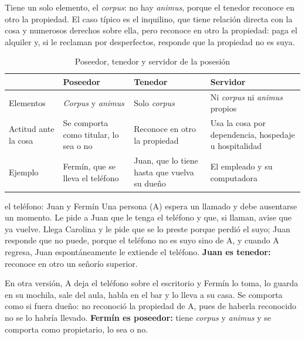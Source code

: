 \documentclass[12pt,oneside]{book}
\begin{document}
Tiene un solo elemento, el \textit{corpus}: no hay \textit{animus}, porque el tenedor reconoce en otro la propiedad. El caso típico es el inquilino, que tiene relación directa con la cosa y numerosos derechos sobre ella, pero reconoce en otro la propiedad: paga el alquiler y, si le reclaman por desperfectos, responde que la propiedad no es suya.

\begin{table}[H]
\centering
\small
\begin{tabularx}{\textwidth}{>{\raggedright\arraybackslash}p{}>{\raggedright\arraybackslash}X>{\raggedright\arraybackslash}X>{\raggedright\arraybackslash}X}
\toprule
 & \textbf{Poseedor} & \textbf{Tenedor} & \textbf{Servidor} \\
\midrule
Elementos & \textit{Corpus} y \textit{animus} & Solo \textit{corpus} & Ni \textit{corpus} ni \textit{animus} propios \\
Actitud ante la cosa & Se comporta como titular, lo sea o no & Reconoce en otro la propiedad & Usa la cosa por dependencia, hospedaje u hospitalidad \\
Ejemplo & Fermín, que se lleva el teléfono & Juan, que lo tiene hasta que vuelva su dueño & El empleado y su computadora \\
\bottomrule
\end{tabularx}
\caption{Poseedor, tenedor y servidor de la posesión}
\end{table}

\begin{ejemplo}{el teléfono: Juan y Fermín}
Una persona (A) espera un llamado y debe ausentarse un momento. Le pide a Juan que le tenga el teléfono y que, si llaman, avise que ya vuelve. Llega Carolina y le pide que se lo preste porque perdió el suyo; Juan responde que no puede, porque el teléfono no es suyo sino de A, y cuando A regresa, Juan espontáneamente le extiende el teléfono. \textbf{Juan es tenedor:} reconoce en otro un señorío superior.

En otra versión, A deja el teléfono sobre el escritorio y Fermín lo toma, lo guarda en su mochila, sale del aula, habla en el bar y lo lleva a su casa. Se comporta como si fuera dueño: no reconoció la propiedad de A, pues de haberla reconocido no se lo habría llevado. \textbf{Fermín es poseedor:} tiene \textit{corpus} y \textit{animus} y se comporta como propietario, lo sea o no.
\end{ejemplo}
\end{document}
